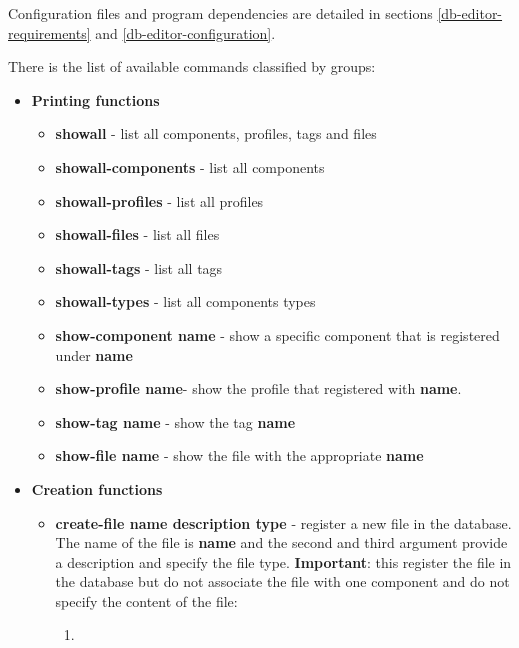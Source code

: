 \documentclass[11pt]{book}
\begin{document}
Configuration files and program dependencies are detailed in sections
\ref{db-editor-requirements} and \ref{db-editor-configuration}.

There is the list of available commands classified by groups:
\begin{itemize}
   \item
      \textbf{Printing functions}
         \begin{itemize}
            \item
               \textbf{showall} - list all components, profiles, tags and files
            \item
               \textbf{showall-components} - list all components
            \item
               \textbf{showall-profiles} - list all profiles
            \item
               \textbf{showall-files} - list all files
            \item
               \textbf{showall-tags} - list all tags
            \item
               \textbf{showall-types} - list all components types
            \item
               \textbf{show-component name} - show a specific component that is
               registered under \textbf{name}
            \item
               \textbf{show-profile name}- show the profile that registered with
               \textbf{name}.
            \item
               \textbf{show-tag name} - show the tag \textbf{name}
            \item
               \textbf{show-file name} - show the file with the appropriate
               \textbf{name}
        \end{itemize}
   \item
      \textbf{Creation functions}
      \begin{itemize}
         \item
            \textbf{create-file name description type} - register a new file in
            the database. The name of the file is \textbf{name} and the second
            and third argument provide a description and specify the file type.
            \textbf{Important}: this register the file in the database but do
            not associate the file with one component and do not specify the
            content of the file:
            \begin{enumerate}
               \item

\end{enumerate}
\end{itemize}
\end{itemize}
\end{document}
